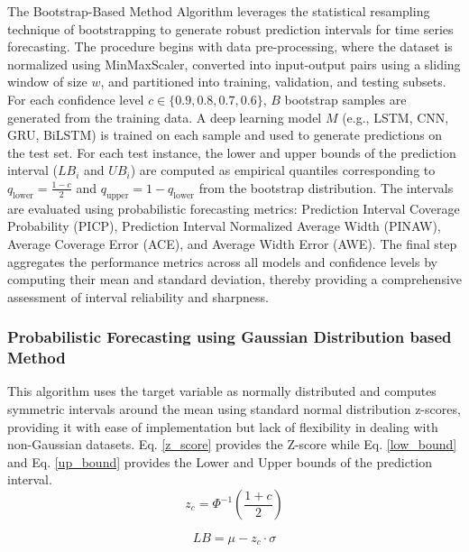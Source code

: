 \begin{itemize}
        The Bootstrap-Based Method Algorithm leverages the statistical resampling technique of bootstrapping to generate robust prediction intervals for time series forecasting. The procedure begins with data pre-processing, where the dataset is normalized using MinMaxScaler, converted into input-output pairs using a sliding window of size $w$, and partitioned into training, validation, and testing subsets. For each confidence level $c \in \{0.9, 0.8, 0.7, 0.6\}$, $B$ bootstrap samples are generated from the training data. A deep learning model $M$ (e.g., LSTM, CNN, GRU, BiLSTM) is trained on each sample and used to generate predictions on the test set. For each test instance, the lower and upper bounds of the prediction interval ($LB_i$ and $UB_i$) are computed as empirical quantiles corresponding to $q_{\text{lower}} = \frac{1 - c}{2}$ and $q_{\text{upper}} = 1 - q_{\text{lower}}$ from the bootstrap distribution. The intervals are evaluated using probabilistic forecasting metrics: Prediction Interval Coverage Probability (PICP), Prediction Interval Normalized Average Width (PINAW), Average Coverage Error (ACE), and Average Width Error (AWE). The final step aggregates the performance metrics across all models and confidence levels by computing their mean and standard deviation, thereby providing a comprehensive assessment of interval reliability and sharpness.


    \subsubsection{Probabilistic Forecasting using Gaussian Distribution based Method}
    This algorithm uses the target variable as normally distributed and computes symmetric intervals around the mean using standard normal distribution z-scores, providing it with ease of implementation but lack of flexibility in dealing with non-Gaussian datasets. Eq. \eqref{z_score} provides the Z-score while Eq. \eqref{low_bound} and Eq. \eqref{up_bound} provides the Lower and Upper bounds of the prediction interval.\\

    \begin{equation}
    z_c = \Phi^{-1}\left(\frac{1 + c}{2}\right)
    \label{z_score}
    \end{equation}

    \begin{equation}
        LB = \mu - z_c \cdot \sigma
    \label{low_bound}
    \end{equation}


\end{itemize}
